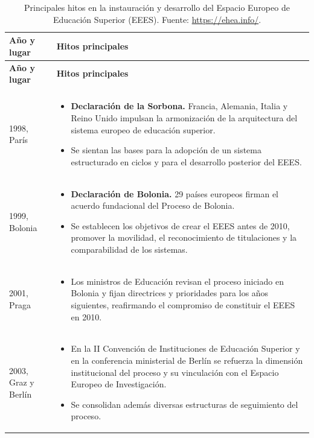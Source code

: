 \documentclass[
  letterpaper,
  DIV=11,
  numbers=noendperiod]{scrartcl}
\author{}
\date{}
\begin{document}
\begin{longtable*}{p{3cm} p{11.5cm}} \caption[Principales hitos en el EEES]{Principales hitos en la instauración y desarrollo del Espacio Europeo de Educación Superior (EEES). Fuente: \protect\url{https://ehea.info/}.\label{tbl-EEES}}\\

\toprule
\textbf{Año y lugar} & \textbf{Hitos principales} \\
\midrule
\endfirsthead

\hline
\textbf{Año y lugar} & \textbf{Hitos principales} \\
\hline
\endhead

\hline
\endfoot

\hline
{} \\
\endfoot

\hline
\endlastfoot

1998, París &
\begin{itemize}
\item \textbf{Declaración de la Sorbona.} Francia, Alemania, Italia y Reino Unido impulsan la armonización de la arquitectura del sistema europeo de educación superior.
\item Se sientan las bases para la adopción de un sistema estructurado en ciclos y para el desarrollo posterior del EEES.
\end{itemize}
\\ \hline

1999, Bolonia &
\begin{itemize}
\item \textbf{Declaración de Bolonia.} 29 países europeos firman el acuerdo fundacional del Proceso de Bolonia.
\item Se establecen los objetivos de crear el EEES antes de 2010, promover la movilidad, el reconocimiento de titulaciones y la comparabilidad de los sistemas.
\end{itemize}
\\ \hline

2001, Praga &
\begin{itemize}
\item Los ministros de Educación revisan el proceso iniciado en Bolonia y fijan directrices y prioridades para los años siguientes, reafirmando el compromiso de constituir el EEES en 2010.
\end{itemize}
\\ \hline

2003, Graz y Berlín &
\begin{itemize}
\item En la II Convención de Instituciones de Educación Superior y en la conferencia ministerial de Berlín se refuerza la dimensión institucional del proceso y su vinculación con el Espacio Europeo de Investigación.
\item Se consolidan además diversas estructuras de seguimiento del proceso.
\end{itemize}
\\ \hline


\end{longtable*}
\end{document}
